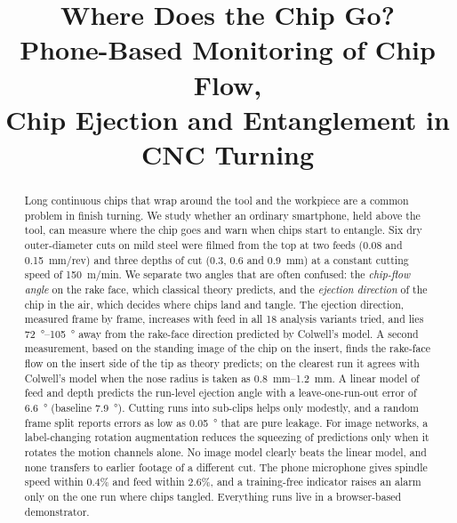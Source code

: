 \documentclass[conference,a4paper]{IEEEtran}
\begin{document}
\title{Where Does the Chip Go?\\ Phone-Based Monitoring of Chip Flow,\\ Chip Ejection and Entanglement in CNC Turning}

\author{
}

\maketitle

\begin{abstract}
Long continuous chips that wrap around the tool and the workpiece are a common problem in finish turning.
We study whether an ordinary smartphone, held above the tool, can measure where the chip goes and warn when chips start to entangle.
Six dry outer-diameter cuts on mild steel were filmed from the top at two feeds (0.08 and \SI{0.15}{mm/rev}) and three depths of cut (0.3, 0.6 and \SI{0.9}{mm}) at a constant cutting speed of \SI{150}{m/min}.
We separate two angles that are often confused: the \emph{chip-flow angle} on the rake face, which classical theory predicts, and the \emph{ejection direction} of the chip in the air, which decides where chips land and tangle.
The ejection direction, measured frame by frame, increases with feed in all 18 analysis variants tried, and lies \SIrange{72}{105}{\degree} away from the rake-face direction predicted by Colwell's model.
A second measurement, based on the standing image of the chip on the insert, finds the rake-face flow on the insert side of the tip as theory predicts; on the clearest run it agrees with Colwell's model when the nose radius is taken as \SIrange{0.8}{1.2}{mm}.
A linear model of feed and depth predicts the run-level ejection angle with a leave-one-run-out error of \SI{6.6}{\degree} (baseline \SI{7.9}{\degree}).
Cutting runs into sub-clips helps only modestly, and a random frame split reports errors as low as \SI{0.05}{\degree} that are pure leakage.
For image networks, a label-changing rotation augmentation reduces the squeezing of predictions only when it rotates the motion channels alone. No image model clearly beats the linear model, and none transfers to earlier footage of a different cut.
The phone microphone gives spindle speed within 0.4\% and feed within 2.6\%, and a training-free indicator raises an alarm only on the one run where chips tangled.
Everything runs live in a browser-based demonstrator.
\end{abstract}
\end{document}
